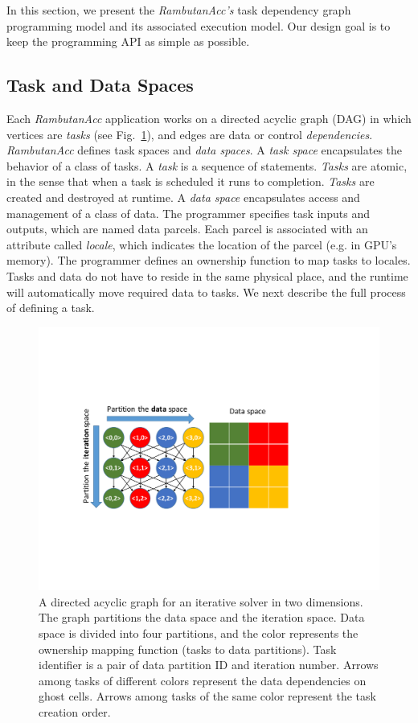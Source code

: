 In this section, we present the {\em RambutanAcc's} task dependency graph programming model and its associated execution model.
Our design goal is to keep the programming API as simple as possible.


\subsection{Task and Data Spaces}
Each {\em RambutanAcc} application works on a directed acyclic graph (DAG) in which vertices are {\em tasks} (see Fig.~\ref{fig:taskGraph}),
and edges are data or control {\em dependencies}.
{\em RambutanAcc} defines {\em }task spaces and {\em data spaces}.
A {\em task space} encapsulates the behavior of a class of tasks.
A {\em task} is a sequence of statements.
{\em Tasks} are atomic, in the sense that when a task is scheduled it runs to completion.
{\em Tasks} are created and destroyed at runtime.
A {\em data space} encapsulates access and management of a class of data.
The programmer specifies task inputs and outputs, which are named data parcels.
Each parcel is associated with an attribute called {\em locale}, which indicates the location of the parcel (e.g. in GPU's memory).
The programmer defines an ownership function to map tasks to locales.
Tasks and data do not have to reside in the same physical place, and the runtime will automatically move required data to tasks.
We next describe the full process of defining a task.


\begin{figure}[htb]
\centering
\includegraphics[width=.47\textwidth]{figures/taskGraph.pdf}
\caption{A directed acyclic graph for an iterative solver in two dimensions. The graph partitions the data space and the iteration space. Data space is divided into four partitions, and the color represents the ownership mapping function (tasks to data partitions). Task identifier is a pair of data partition ID and iteration number. Arrows among tasks of different colors represent the data dependencies on ghost cells. Arrows among tasks of the same color represent the task creation order.} 
\label{fig:taskGraph}
\end{figure}


